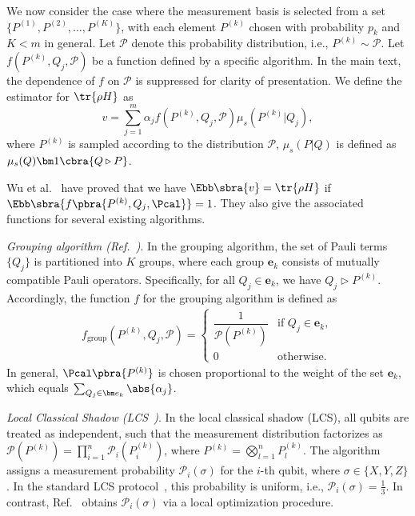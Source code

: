 \documentclass[prl,aps,notitlepage,superscriptaddress,showpacs,nofootinbib]{revtex4-2}
\begin{document}
We now consider the case where the measurement basis is selected from a set $\{P^{(1)}, P^{(2)}, \ldots, P^{(K)}\}$, with each element $P^{(k)}$ chosen with probability $p_k$ and $K<m$ in general. Let $\mathcal{P}$ denote this probability distribution, i.e., $P^{(k)} \sim \mathcal{P}$. Let $f(P^{(k)}, Q_j, \mathcal{P})$ be a function defined by a specific algorithm. In the main text, the dependence of $f$ on $\mathcal{P}$ is suppressed for clarity of presentation.
 We define the estimator for $\tr{\rho H}$ as
\begin{equation}
    v = \sum_{j=1}^m \alpha_j f\left(P^{(k)}, Q_j, \mathcal{P}\right) \mu_s\left(P^{(k)}|Q_j\right),
    \label{eq:framework_meas}
\end{equation}
where $P^{(k)}$ is sampled according to the distribution $\mathcal{P}$,  $\mu_s(P|Q)$ is defined as $\mu_s(Q)\bm 1\cbra{Q \triangleright P}$.

Wu et al.~\cite{wu2023overlapped} have proved that we have $\Ebb\sbra{v} = \tr{\rho H}$ if $\Ebb\sbra{f\pbra{P^{(k)},Q_j, \Pcal}} = 1$. They also give the associated functions for several existing algorithms. 

\textit{Grouping algorithm (Ref.~\cite{kandala2017hardware,crawford2021efficient})}. In the grouping algorithm, the set of Pauli terms $\{Q_j\}$ is partitioned into $K$ groups, where each group $\bm{e}_k$ consists of mutually compatible Pauli operators. Specifically, for all $Q_j \in \bm{e}_k$, we have $Q_j \triangleright P^{(k)}$. Accordingly, the function $f$ for the grouping algorithm is defined as
\begin{align}
    f_{\text{group}}\left(P^{(k)}, Q_j, \mathcal{P} \right) = 
    \begin{cases}
        \dfrac{1}{\mathcal{P}(P^{(k)})} & \text{if } Q_j \in \bm{e}_k, \\
        0 & \text{otherwise}.
    \end{cases}
\end{align}
In general, $\Pcal\pbra{P^{(k)}}$ is chosen proportional to the weight of the set $\bm e_k$, which equals $\sum_{Q_j\in \bm e_k} \abs{\alpha_j}$.

\textit{Local Classical Shadow (LCS~\cite{huang2020predicting,hadfield2022measurements})}. In the local classical shadow (LCS), all qubits are treated as independent, such that the measurement distribution factorizes as $\mathcal{P}(P^{(k)}) = \prod_{i=1}^n \mathcal{P}_i(P^{(k)}_i)$, where $P^{(k)} = \bigotimes_{l=1}^n P^{(k)}_l$. The algorithm assigns a measurement probability $\mathcal{P}_i(\sigma)$ for the $i$-th qubit, where $\sigma \in \{X, Y, Z\}$. In the standard LCS protocol~\cite{huang2020predicting}, this probability is uniform, i.e., $\mathcal{P}_i(\sigma) = \frac{1}{3}$. In contrast, Ref.~\cite{hadfield2022measurements} obtains $\mathcal{P}_i(\sigma)$ via a local optimization procedure.
\end{document}
